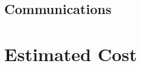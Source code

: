 \documentclass[11pt]{article}		%
\begin{document}
		\subsection{Communications}
		
	\section{Estimated Cost}
	
	
	\pagebreak		%
	
	
	
	\begingroup\onehalfspacing
		{\small
			
			
		}
	\endgroup
\end{document}
